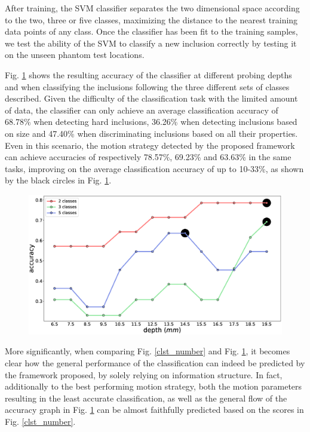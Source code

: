 {After training, the SVM classifier separates the two dimensional space according to the two, three or five classes, maximizing the distance to the nearest training data points of any class. 
Once the classifier has been fit to the training samples, we test the ability of the SVM to classify a new inclusion correctly by testing it on the unseen phantom test locations. 

Fig. \ref{svm_acc} shows the resulting accuracy of the classifier at different probing depths and when classifying the inclusions following the three different sets of classes described. 
Given the difficulty of the classification task with the limited amount of data, the classifier can only achieve an average classification accuracy of 68.78\% when detecting hard inclusions,  36.26\% when detecting inclusions based on size and 47.40\% when discriminating inclusions based on all their properties. Even in this scenario, the motion strategy detected by the proposed framework can achieve accuracies of respectively 78.57\%, 69.23\% and 63.63\% in the same tasks, improving on the average classification accuracy of up to 10-33\%, as shown by the black circles in Fig. \ref{svm_acc}.
\begin{figure}[]
	\centering
	\includegraphics[width=\columnwidth]{./figs/bar_clst_num_change_svm.eps}
	\caption{}
	\label{svm_acc}
\end{figure}
More significantly, when comparing Fig. \ref{clst_number} and Fig. \ref{svm_acc}, it becomes clear how the general performance of the classification can indeed be predicted by the framework proposed, by solely relying on information structure. In fact, additionally to the best performing motion strategy, both the motion parameters resulting in the least accurate classification, as well as the general flow of the accuracy graph in Fig. \ref{svm_acc} can be almost faithfully predicted based on the scores in Fig. \ref{clst_number}.}

